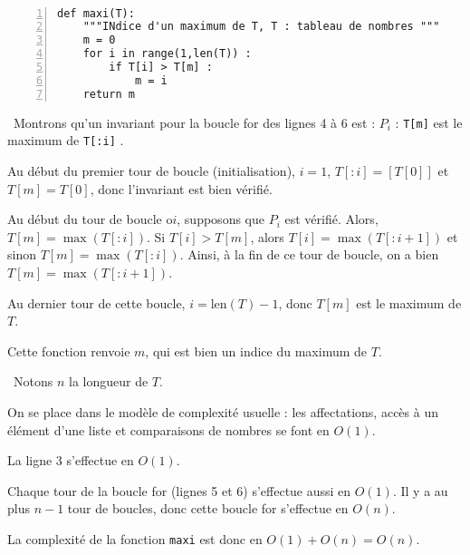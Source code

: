 \exer{}
\setcounter{numques}{0}

\question\

\begin{Verbatim}[gobble=0,numbers=left]
def maxi(T):
    """INdice d'un maximum de T, T : tableau de nombres """
    m = 0
    for i in range(1,len(T)) : 
        if T[i] > T[m] :
            m = i
    return m 
\end{Verbatim}

\question\ Montrons qu'un invariant pour la boucle for des lignes 4 à 6 est : $P_i$ : \og \texttt{T[m]} est le maximum 
de \texttt{T[:i]} \fg. 

Au début du premier tour de boucle (initialisation), $i = 1$, $T[:i] = [T[0]]$ et $T[m] = T[0]$, donc l'invariant est  
bien vérifié. 

Au début du tour de boucle o$i$, supposons que $P_i$ est vérifié. Alors, $T[m] = \max(T[:i])$. Si $T[i] > T[m]$, 
alors $T[i] = \max(T[:i+1])$ et sinon $T[m] = \max(T[:i])$. 
Ainsi, à la fin de ce tour de boucle, on a bien $T[m] = \max(T[:i+1])$. 

Au dernier tour de cette boucle, $i = \mathrm{len}(T)-1$, donc $T[m]$ est le maximum de $T$.

Cette fonction renvoie $m$, qui est bien un indice du maximum de $T$. 

\question\ Notons $n$ la longueur de $T$. 

On se place dans le modèle de complexité usuelle : les affectations, accès à un élément d'une liste et comparaisons de nombres se font en $O(1)$. 

La ligne 3 s'effectue en $O(1)$. 

Chaque tour de la boucle for (lignes 5 et 6) s'effectue aussi en $O(1)$. Il y a au plus $n-1$ tour de boucles, donc cette boucle for s'effectue en $O(n)$. 

La complexité de la fonction \texttt{maxi} est donc en $O(1)+O(n) = O(n)$. 